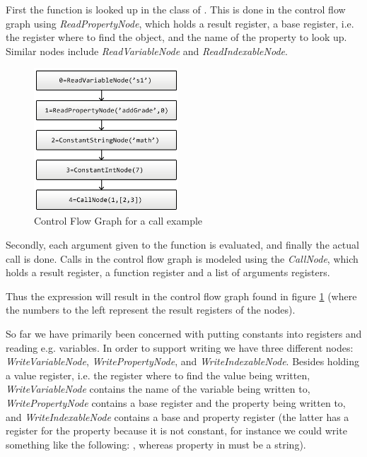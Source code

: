 First the function  is looked up in the class of . This is done in the control flow graph using \textit{ReadPropertyNode}, 
which holds a result register, a base register, i.e. the register where to find the object, and the name of the property to look up. 
Similar nodes include \textit{ReadVariableNode} and \textit{ReadIndexableNode}.

\begin{figure}
	\vspace{-20pt}
	\begin{center}
		\includegraphics[width=0.48\textwidth]{images/Call-example.png}
	\end{center}
	\vspace{-10pt}
	\caption{Control Flow Graph for a call example}
	\label{fig:callCfg}
	\vspace{-10pt}
\end{figure}
Secondly, each argument given to the function is evaluated, and finally the actual call is done. 
Calls in the control flow graph is modeled using the \textit{CallNode}, which holds a result register, 
a function register and a list of arguments registers.

Thus the expression  will result in the control flow graph found in figure \ref{fig:callCfg} 
(where the numbers to the left represent the result registers of the nodes).


So far we have primarily been concerned with putting constants into registers and reading e.g. variables. 
In order to support writing we have three different nodes: \textit{WriteVariableNode}, \textit{WritePropertyNode}, 
and \textit{WriteIndexableNode}. Besides holding a value register, i.e. the register where to find the value being written, 
\textit{WriteVariableNode} contains the name of the variable being written to, 
\textit{WritePropertyNode} contains a base register and the property being written to, 
and \textit{WriteIndexableNode} contains a base and property register (the latter has a register for the property because it is not constant, 
for instance we could write something like the following: , 
whereas property in  must be a string).

